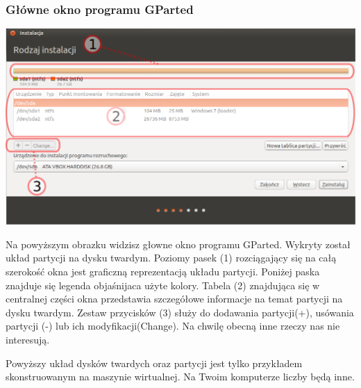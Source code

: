 \subsubsection{Główne okno programu GParted}
\begin{center}
	\includegraphics[scale=0.5]{images/instalator_partycjonowanie_gparted2.png}
\end{center}
Na powyższym obrazku widzisz głowne okno programu GParted. Wykryty został układ partycji na dysku twardym. Poziomy pasek (1) rozciągający się na całą szerokość okna jest graficzną reprezentacją układu partycji. Poniżej paska znajduje się legenda objaśnijaca użyte kolory. Tabela (2) znajdująca się w centralnej części okna przedstawia szczegółowe informacje na temat partycji na dysku twardym. Zestaw przycisków (3) służy do dodawania partycji(+), usówania partycji (-) lub ich modyfikacji(Change). Na chwilę obecną inne rzeczy nas nie interesują.

Powyższy układ dysków twardych oraz partycji jest tylko przykładem skonstruowanym na maszynie wirtualnej. Na Twoim komputerze liczby będą inne.

